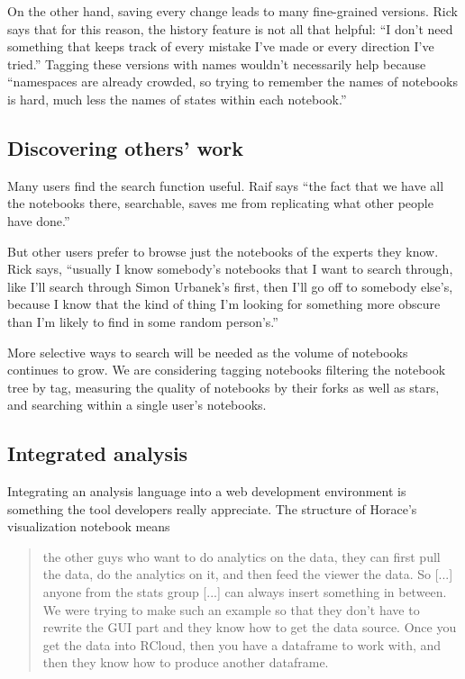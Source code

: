 On the other hand, saving every change leads to many fine-grained
versions. Rick says that for this reason, the history feature is not all that
helpful: ``I don't need something that keeps track of every mistake I've made or
every direction I've tried.'' Tagging these versions with names wouldn't
necessarily help because ``namespaces are already crowded, so trying to remember
the names of notebooks is hard, much less the names of states within each
notebook.''


\subsection{Discovering others' work}
Many users find the search function useful. Raif says ``the fact that we have
all the notebooks there, searchable, saves me from replicating what other people
have done.''

But other users prefer to browse just the notebooks of the experts they
know. Rick says, ``usually I know somebody's notebooks that I want to search
through, like I'll search through Simon Urbanek's first, then I'll go off to
somebody else's, because I know that the kind of thing I'm looking for something
more obscure than I'm likely to find in some random person's.''

More selective ways to search will be needed as the volume of notebooks
continues to grow. We are considering tagging notebooks filtering the notebook
tree by tag, measuring the quality of notebooks by their forks as well as stars,
and searching within a single user's notebooks.


\subsection{Integrated analysis}
Integrating an analysis language into a web development environment is something
the tool developers really appreciate.  The structure of Horace's visualization
notebook means
\begin{quote}
the other guys who want to do analytics on the data, they can first pull the
data, do the analytics on it, and then feed the viewer the data. So [...]
anyone from the stats group [...] can always insert something in between. We
were trying to make such an example so that they don't have to rewrite the GUI
part and they know how to get the data source. Once you get the data into
RCloud, then you have a dataframe to work with, and then they know how to
produce another dataframe.
\end{quote}

